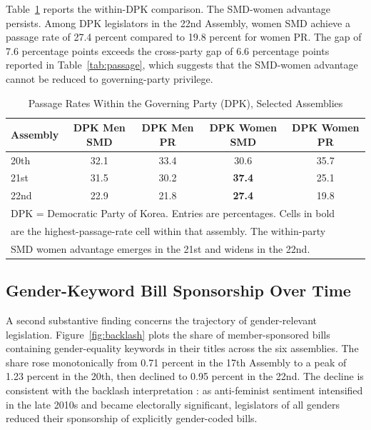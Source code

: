 \documentclass[11pt]{article}
\begin{document}
Table~\ref{tab:byparty} reports the within-DPK comparison. The SMD-women advantage persists. Among DPK legislators in the 22nd Assembly, women SMD achieve a passage rate of 27.4 percent compared to 19.8 percent for women PR. The gap of 7.6 percentage points exceeds the cross-party gap of 6.6 percentage points reported in Table~\ref{tab:passage}, which suggests that the SMD-women advantage cannot be reduced to governing-party privilege.

\begin{table}[H]
\centering
\caption{Passage Rates Within the Governing Party (DPK), Selected Assemblies}
\label{tab:byparty}
\begin{tabular}{lcccc}
\toprule
Assembly & DPK Men SMD & DPK Men PR & DPK Women SMD & DPK Women PR \\
\midrule
20th & 32.1 & 33.4 & 30.6 & 35.7 \\
21st & 31.5 & 30.2 & \textbf{37.4} & 25.1 \\
22nd & 22.9 & 21.8 & \textbf{27.4} & 19.8 \\
\bottomrule
\multicolumn{5}{l}{\footnotesize DPK = Democratic Party of Korea. Entries are percentages. Cells in bold} \\
\multicolumn{5}{l}{\footnotesize are the highest-passage-rate cell within that assembly. The within-party} \\
\multicolumn{5}{l}{\footnotesize SMD women advantage emerges in the 21st and widens in the 22nd.} \\
\end{tabular}
\end{table}

\subsection{Gender-Keyword Bill Sponsorship Over Time}

A second substantive finding concerns the trajectory of gender-relevant legislation. Figure~\ref{fig:backlash} plots the share of member-sponsored bills containing gender-equality keywords in their titles across the six assemblies. The share rose monotonically from 0.71 percent in the 17th Assembly to a peak of 1.23 percent in the 20th, then declined to 0.95 percent in the 22nd. The decline is consistent with the backlash interpretation \citep{woo2023, kimLeeKang2025}: as anti-feminist sentiment intensified in the late 2010s and became electorally significant, legislators of all genders reduced their sponsorship of explicitly gender-coded bills.
\end{document}
